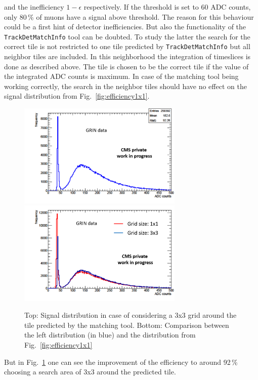 			and the inefficiency $1-\epsilon$ respectively.
			If the threshold is set to 60 ADC counts, only 80\,\% of muons have a signal above threshold.
			The reason for this behaviour could be a first hint of detector inefficiencies.
			But also the functionality of the \verb+TrackDetMatchInfo+ tool can be doubted.
			To study the latter the search for the correct tile is not restricted to one tile predicted by \verb+TrackDetMatchInfo+ but all neighbor tiles are included.
			In this neighborhood the integration of timeslices is done as described above.
			The tile is chosen to be the correct tile if the value of the integrated ADC counts is maximum.
			In case of the matching tool being working correctly, the search in the neighbor tiles should have no effect on the signal distribution from Fig.\ \ref{fig:efficiency1x1}.
			\begin{figure}[htbp]
				\centering
				\includegraphics[width=0.70\textwidth]{Figures/erdogan/neighborhood2.png}
				\includegraphics[width=0.70\textwidth]{Figures/erdogan/neighborhood.png}
				\caption{Top: Signal distribution in case of considering a 3x3 grid around the tile predicted by the matching tool. Bottom: Comparison between the left distribution (in blue) and the distribution
				from Fig.\ \ref{fig:efficiency1x1}}
				\label{fig:neighborhood}
			\end{figure}
			But in Fig.\ \ref{fig:neighborhood} one can see the improvement of the efficiency to around 92\,\% choosing a search area of 3x3 around the predicted tile.

